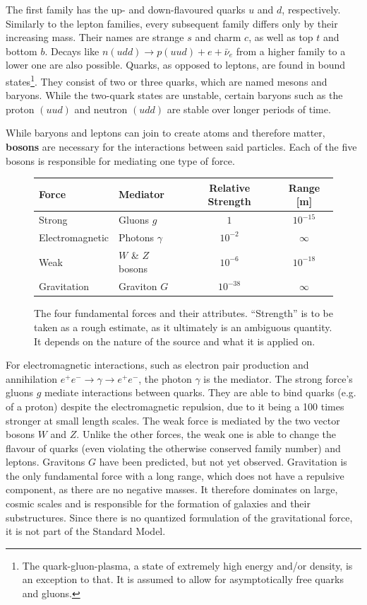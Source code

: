 The first family has the up- and down-flavoured quarks $u$ and $d$, respectively. Similarly to the lepton families, every subsequent family differs only by their increasing mass. Their names are strange $s$ and charm $c$, as well as top $t$ and bottom $b$. Decays like $n(udd) \rightarrow p(uud) + e + \bar{\nu}_e$ from a higher family to a lower one are also possible. Quarks, as opposed to leptons, are found in bound states\footnote{The quark-gluon-plasma, a state of extremely high energy and/or density, is an exception to that. It is assumed to allow for asymptotically free quarks and gluons.}. They consist of two or three quarks, which are named mesons and baryons. While the two-quark states are unstable, certain baryons such as the proton $(uud)$ and neutron $(udd)$ are stable over longer periods of time.


While baryons and leptons can join to create atoms and therefore matter, \textbf{bosons} are necessary for the interactions between said particles. Each of the five bosons is responsible for mediating one type of force.

\begin{figure}[!htb]
  \centering
  \begin{tabular}{|l|l|c|c|}
    \hline
    Force           & Mediator          & Relative Strength & Range [m]  \\ \hline
    Strong          & Gluons $g$        & $1$               & $10^{-15}$ \\
    Electromagnetic & Photons $\gamma$  & $10^{-2}$         & $\infty$   \\
    Weak            & $W$ \& $Z$ bosons & $10^{-6}$         & $10^{-18}$ \\
    Gravitation     & Graviton $G$      & $10^{-38}$        & $\infty$   \\
    \hline  
  \end{tabular}
  \caption{The four fundamental forces and their attributes. ``Strength'' is to be taken as a rough estimate, as it ultimately is an ambiguous quantity. It depends on the nature of the source and what it is applied on.}
  \label{tab:fundforces}
\end{figure}

For electromagnetic interactions, such as electron pair production and annihilation $e^+ e^- \rightarrow \gamma \rightarrow e^+ e^-$, the photon $\gamma$ is the mediator. The strong force's gluons $g$ mediate interactions between quarks. They are able to bind quarks (e.g. of a proton) despite the electromagnetic repulsion, due to it being a 100 times stronger at small length scales. The weak force is mediated by the two vector bosons $W$ and $Z$. Unlike the other forces, the weak one is able to change the flavour of quarks (even violating the otherwise conserved family number) and leptons. Gravitons $G$ have been predicted, but not yet observed. Gravitation is the only fundamental force with a long range, which does not have a repulsive component, as there are no negative masses. It therefore dominates on large, cosmic scales and is responsible for the formation of galaxies and their substructures. Since there is no quantized formulation of the gravitational force, it is not part of the Standard Model.

